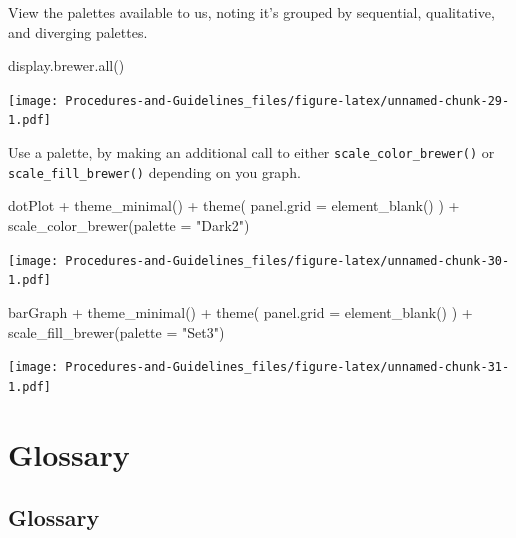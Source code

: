 \documentclass[
]{book}
\newenvironment{Shaded}{\begin{snugshade}}{\end{snugshade}}
\newcommand{\AttributeTok}[1]{\textcolor[rgb]{0.77,0.63,0.00}{#1}}
\newcommand{\FunctionTok}[1]{\textcolor[rgb]{0.00,0.00,0.00}{#1}}
\newcommand{\NormalTok}[1]{#1}
\newcommand{\SpecialCharTok}[1]{\textcolor[rgb]{0.00,0.00,0.00}{#1}}
\newcommand{\StringTok}[1]{\textcolor[rgb]{0.31,0.60,0.02}{#1}}
\begin{document}
View the palettes available to us, noting it's grouped by sequential, qualitative, and diverging palettes.

\begin{Shaded}
\begin{Highlighting}[]
\FunctionTok{display.brewer.all}\NormalTok{()}
\end{Highlighting}
\end{Shaded}

\texttt{[image: Procedures-and-Guidelines\_files/figure-latex/unnamed-chunk-29-1.pdf]}

Use a palette, by making an additional call to either \texttt{scale\_color\_brewer()} or \texttt{scale\_fill\_brewer()} depending on you graph.

\begin{Shaded}
\begin{Highlighting}[]
\NormalTok{dotPlot }\SpecialCharTok{+}
  \FunctionTok{theme\_minimal}\NormalTok{() }\SpecialCharTok{+}
  \FunctionTok{theme}\NormalTok{(}
    \AttributeTok{panel.grid =} \FunctionTok{element\_blank}\NormalTok{()}
\NormalTok{  ) }\SpecialCharTok{+}
  \FunctionTok{scale\_color\_brewer}\NormalTok{(}\AttributeTok{palette =} \StringTok{"Dark2"}\NormalTok{)}
\end{Highlighting}
\end{Shaded}

\texttt{[image: Procedures-and-Guidelines\_files/figure-latex/unnamed-chunk-30-1.pdf]}

\begin{Shaded}
\begin{Highlighting}[]
\NormalTok{barGraph }\SpecialCharTok{+}
  \FunctionTok{theme\_minimal}\NormalTok{() }\SpecialCharTok{+}
  \FunctionTok{theme}\NormalTok{(}
    \AttributeTok{panel.grid =} \FunctionTok{element\_blank}\NormalTok{()}
\NormalTok{  ) }\SpecialCharTok{+}
  \FunctionTok{scale\_fill\_brewer}\NormalTok{(}\AttributeTok{palette =} \StringTok{"Set3"}\NormalTok{)}
\end{Highlighting}
\end{Shaded}

\texttt{[image: Procedures-and-Guidelines\_files/figure-latex/unnamed-chunk-31-1.pdf]}

\hypertarget{part-glossary}{%
\part*{Glossary}\label{part-glossary}}

\hypertarget{glossary}{%
\chapter{Glossary}\label{glossary}}
\end{document}
